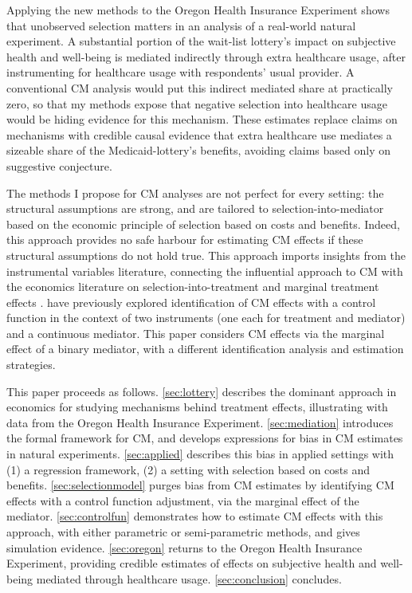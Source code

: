 Applying the new methods to the Oregon Health Insurance Experiment shows that unobserved selection matters in an analysis of a real-world natural experiment.
A substantial portion of the wait-list lottery's impact on subjective health and well-being is mediated indirectly through extra healthcare usage, after instrumenting for healthcare usage with respondents' usual provider.
A conventional CM analysis would put this indirect mediated share at practically zero, so that my methods expose that negative selection into healthcare usage would be hiding evidence for this mechanism.
These estimates replace claims on mechanisms with credible causal evidence that extra healthcare use mediates a sizeable share of the Medicaid-lottery's benefits, avoiding claims based only on suggestive conjecture.

The methods I propose for CM analyses are not perfect for every setting: the structural assumptions are strong, and are tailored to selection-into-mediator based on the economic principle of selection based on costs and benefits.
Indeed, this approach provides no safe harbour for estimating CM effects if these structural assumptions do not hold true.
This approach imports insights from the instrumental variables literature, connecting the influential \cite{imai2010identification} approach to CM with the economics literature on selection-into-treatment and marginal treatment effects \citep{vytlacil2002independence,heckman2004using,heckman2005structural,florens2008identification,kline2019heckits}.
\cite{frolich2017direct} have previously explored identification of CM effects with a control function in the context of two instruments (one each for treatment and mediator) and a continuous mediator.
This paper considers CM effects via the marginal effect of a binary mediator, with a different identification analysis and estimation strategies.

This paper proceeds as follows.
\autoref{sec:lottery} describes the dominant approach in economics for studying mechanisms behind treatment effects, illustrating with data from the Oregon Health Insurance Experiment.
\autoref{sec:mediation} introduces the formal framework for CM, and develops expressions for bias in CM estimates in natural experiments.
\autoref{sec:applied} describes this bias in applied settings with (1) a regression framework, (2) a setting with selection based on costs and benefits.
\autoref{sec:selectionmodel} purges bias from CM estimates by identifying CM effects with a control function adjustment, via the marginal effect of the mediator.
\autoref{sec:controlfun} demonstrates how to estimate CM effects with this approach, with either parametric or semi-parametric methods, and gives simulation evidence.
\autoref{sec:oregon} returns to the Oregon Health Insurance Experiment, providing credible estimates of effects on subjective health and well-being mediated through healthcare usage.
\autoref{sec:conclusion} concludes.
